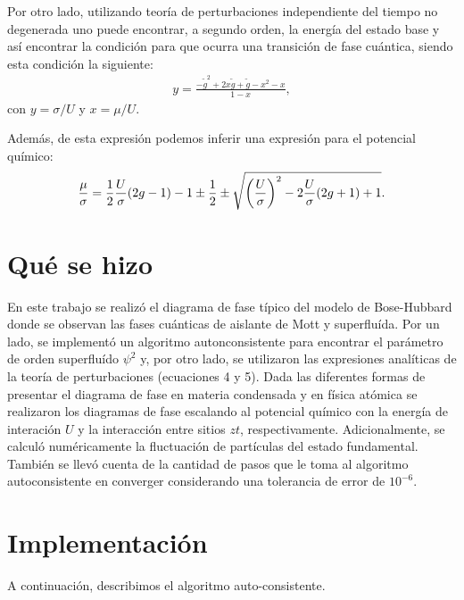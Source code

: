 \documentclass[11pt,letterpaper]{article}
\begin{document}
Por otro lado, utilizando teoría de perturbaciones independiente del tiempo 
no degenerada uno puede encontrar, a segundo orden, la energía del 
estado base y así encontrar la condición para que ocurra una 
transición de fase cuántica, siendo esta condición la siguiente:
\begin{align}
y=\frac{-\tilde g^2+2x\tilde g+\tilde g-x^2-x}{1-x},
\end{align}
con $y=\sigma /U$ y $x=\mu / U$. 

Además, de esta expresión podemos inferir una expresión para 
el potencial químico:
\begin{align}
\frac{\mu}{\sigma}=\frac{1}{2}\frac{U}{\sigma}\qty(2g-1)-1\pm
\frac{1}{2}\pm \sqrt{\qty(\frac{U}{\sigma})^2-2\frac{U}{\sigma}\qty(2g+1)+1}.
\end{align}


\section{Qué se hizo}\label{sec:queHacer}
En este trabajo se realizó el diagrama de fase típico
del modelo de Bose-Hubbard donde se observan las fases cuánticas de 
aislante de Mott y superfluída. Por un lado, se implementó un algoritmo
autonconsistente para encontrar el parámetro de orden superfluído $\psi^2$ y,
por otro lado, se utilizaron las expresiones analíticas de la teoría de 
perturbaciones (ecuaciones 4 y 5). Dada las diferentes formas de presentar el diagrama de fase 
en materia condensada y en física atómica se realizaron los diagramas de 
fase escalando al potencial químico con la energía de interación $U$ y 
la interacción entre sitios $zt$, respectivamente. Adicionalmente, 
se calculó numéricamente la fluctuación de partículas del estado fundamental.
También se llevó cuenta de la cantidad de pasos que le toma al algoritmo 
autoconsistente en converger considerando una tolerancia de error de 
$10^{-6}$.


\section{Implementación}
A continuación, describimos el algoritmo auto-consistente.
\end{document}
